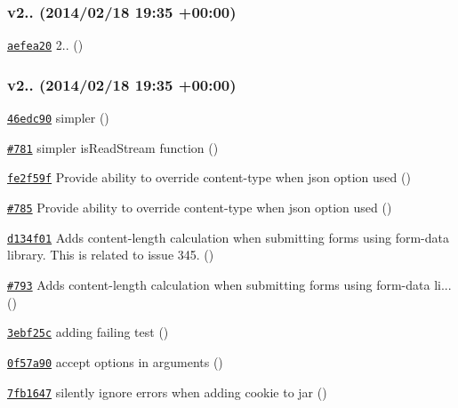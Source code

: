 \subsubsection*{v2.. (2014/02/18 19\+:35 +00\+:00)}


\begin{DoxyItemize}
\item \href{https://github.com/mikeal/request/commit/aefea20b215ff1a48f0d8d27dcac0186604e3b2d}{\tt aefea20} 2.. ()
\end{DoxyItemize}

\subsubsection*{v2.. (2014/02/18 19\+:35 +00\+:00)}


\begin{DoxyItemize}
\item \href{https://github.com/mikeal/request/commit/46edc902e6ffdee39038a6702021728cb9d9b8fa}{\tt 46edc90} simpler ()
\item \href{https://github.com/mikeal/request/pull/781}{\tt \#781} simpler is\+Read\+Stream function ()
\item \href{https://github.com/mikeal/request/commit/fe2f59fdc72de5c86404e51ab6bc4e0e8ece95f2}{\tt fe2f59f} Provide ability to override content-\/type when {\ttfamily json} option used ()
\item \href{https://github.com/mikeal/request/pull/785}{\tt \#785} Provide ability to override content-\/type when {\ttfamily json} option used ()
\item \href{https://github.com/mikeal/request/commit/d134f012e64702e8f4070d61504b39524e1a07ba}{\tt d134f01} Adds content-\/length calculation when submitting forms using form-\/data library. This is related to issue 345. ()
\item \href{https://github.com/mikeal/request/pull/793}{\tt \#793} Adds content-\/length calculation when submitting forms using form-\/data li... ()
\item \href{https://github.com/mikeal/request/commit/3ebf25c5af1194d8f7b3a3330fe89e729532809b}{\tt 3ebf25c} adding failing test ()
\item \href{https://github.com/mikeal/request/commit/0f57a90384588727a5446bb1f5bf4e0be2d85780}{\tt 0f57a90} accept options in arguments ()
\item \href{https://github.com/mikeal/request/commit/7fb164731a5aad80c6539e33eda4ad4a51bb7871}{\tt 7fb1647} silently ignore errors when adding cookie to jar ()

\end{DoxyItemize}
